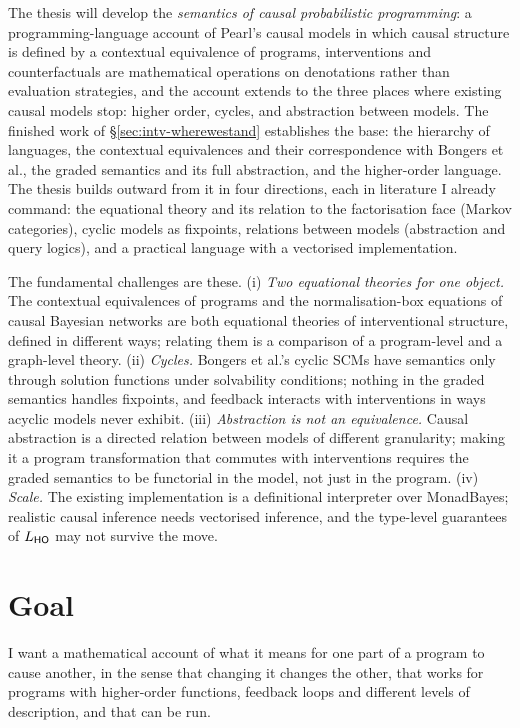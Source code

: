 The thesis will develop the \emph{semantics of causal probabilistic programming}: a programming-language account of Pearl's causal models in which causal structure is defined by a contextual equivalence of programs, interventions and counterfactuals are mathematical operations on denotations rather than evaluation strategies, and the account extends to the three places where existing causal models stop: higher order, cycles, and abstraction between models. The finished work of \S\ref{sec:intv-wherewestand} establishes the base: the hierarchy of languages, the contextual equivalences and their correspondence with Bongers et al., the graded semantics and its full abstraction, and the higher-order language. The thesis builds outward from it in four directions, each in literature I already command: the equational theory and its relation to the factorisation face (Markov categories), cyclic models as fixpoints, relations between models (abstraction and query logics), and a practical language with a vectorised implementation.

The fundamental challenges are these. (i) \emph{Two equational theories for one object.} The contextual equivalences of programs and the normalisation-box equations of causal Bayesian networks are both equational theories of interventional structure, defined in different ways; relating them is a comparison of a program-level and a graph-level theory. (ii) \emph{Cycles.} Bongers et al.'s cyclic SCMs have semantics only through solution functions under solvability conditions; nothing in the graded semantics handles fixpoints, and feedback interacts with interventions in ways acyclic models never exhibit. (iii) \emph{Abstraction is not an equivalence.} Causal abstraction is a directed relation between models of different granularity; making it a program transformation that commutes with interventions requires the graded semantics to be functorial in the model, not just in the program. (iv) \emph{Scale.} The existing implementation is a definitional interpreter over MonadBayes; realistic causal inference needs vectorised inference, and the type-level guarantees of $L_{\mathsf{HO}}$ may not survive the move.

\section{Goal}

I want a mathematical account of what it means for one part of a program to cause another, in the sense that changing it changes the other, that works for programs with higher-order functions, feedback loops and different levels of description, and that can be run.

